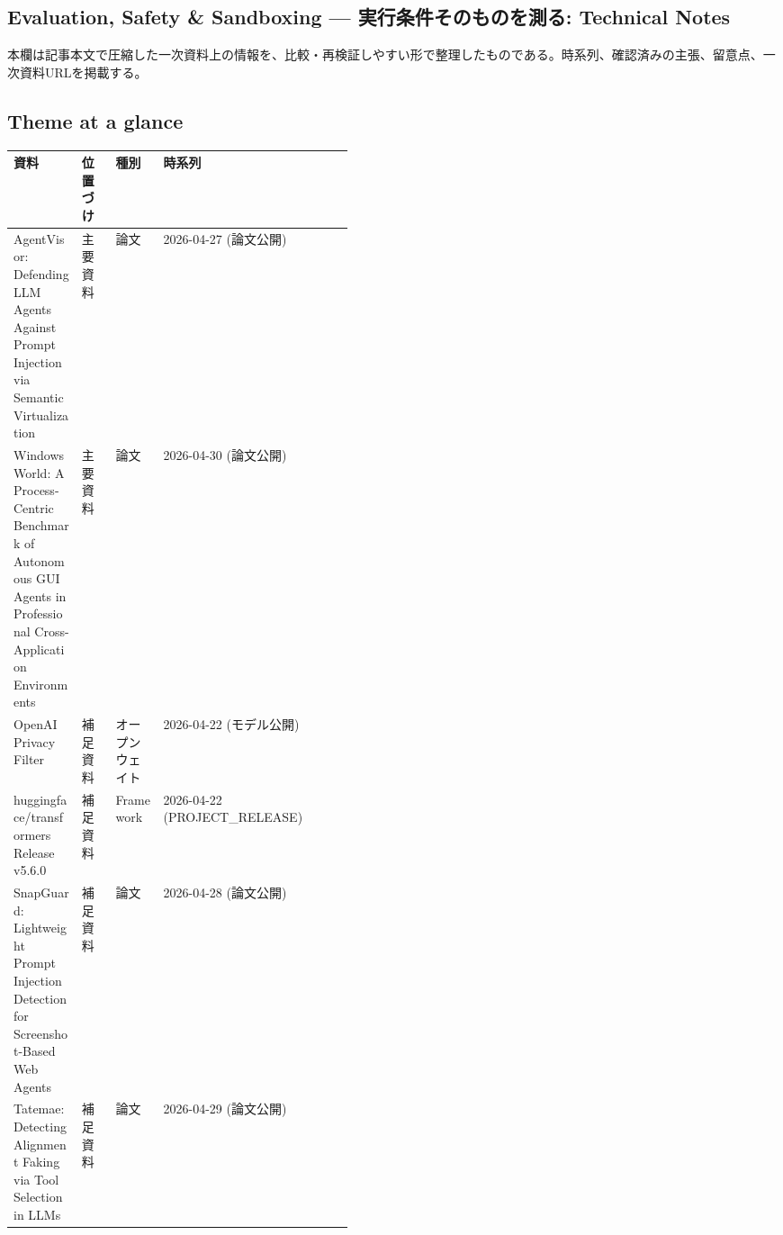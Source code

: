 \subsection*{Evaluation, Safety \& Sandboxing — 実行条件そのものを測る: Technical Notes}
本欄は記事本文で圧縮した一次資料上の情報を、比較・再検証しやすい形で整理したものである。時系列、確認済みの主張、留意点、一次資料URLを掲載する。
\medskip
\subsection*{Theme at a glance}
\begin{center}
\footnotesize
\begin{tabularx}{\linewidth}{@{}p{0.20\linewidth}p{0.10\linewidth}p{0.14\linewidth}X@{}}
\toprule
資料 & 位置づけ & 種別 & 時系列 \\
\midrule
AgentVisor: Defending LLM Agents Against Prompt Injection via Semantic Virtualization & 主要資料 & 論文 & 2026-04-27 (論文公開) \\
WindowsWorld: A Process-Centric Benchmark of Autonomous GUI Agents in Professional Cross-Application Environments & 主要資料 & 論文 & 2026-04-30 (論文公開) \\
OpenAI Privacy Filter & 補足資料 & オープンウェイト & 2026-04-22 (モデル公開) \\
huggingface/transformers Release v5.6.0 & 補足資料 & Framework & 2026-04-22 (PROJECT\_RELEASE) \\
SnapGuard: Lightweight Prompt Injection Detection for Screenshot-Based Web Agents & 補足資料 & 論文 & 2026-04-28 (論文公開) \\
Tatemae: Detecting Alignment Faking via Tool Selection in LLMs & 補足資料 & 論文 & 2026-04-29 (論文公開) \\
\bottomrule
\end{tabularx}
\end{center}
\normalsize

